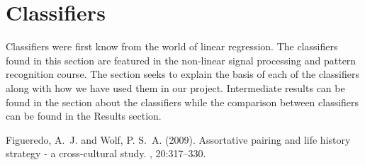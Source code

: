 \section{Classifiers}
Classifiers were first know from the world of linear regression. The classifiers found in this section are featured in the non-linear signal processing and pattern recognition course. The section seeks to explain the basis of each of the classifiers along with how we have used them in our project. Intermediate results can be found in the section about the classifiers while the comparison between classifiers can be found in the Results section.










\begin{thebibliography}{99} %

Figueredo, A.~J. and Wolf, P. S.~A. (2009).
\newblock Assortative pairing and life history strategy - a cross-cultural
  study.
, 20:317--330.
 
\end{thebibliography}



